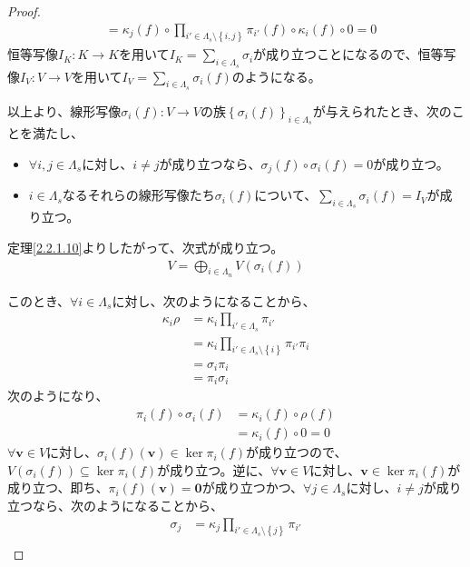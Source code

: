 \documentclass[dvipdfmx]{jsarticle}
\begin{document}
\begin{proof}
\begin{align*}
&= \kappa_{j}(f) \circ \prod_{i' \in \varLambda_{s} \setminus \left\{ i,j \right\}} {\pi_{i'}(f)} \circ \kappa_{i}(f) \circ 0 = 0
\end{align*}
恒等写像$I_{K}:K \rightarrow K$を用いて$I_{K} = \sum_{i \in \varLambda_{s}} \sigma_{i}$が成り立つことになるので、恒等写像$I_{V}:V \rightarrow V$を用いて$I_{V} = \sum_{i \in \varLambda_{s}} {\sigma_{i}(f)}$のようになる。\par
以上より、線形写像$\sigma_{i}(f):V \rightarrow V$の族$\left\{ \sigma_{i}(f) \right\}_{i \in \varLambda_{s}}$が与えられたとき、次のことを満たし、
\begin{itemize}
\item
  $\forall i,j \in \varLambda_{s}$に対し、$i \neq j$が成り立つなら、$\sigma_{j}(f) \circ \sigma_{i}(f) = 0$が成り立つ。
\item
  $i \in \varLambda_{s}$なるそれらの線形写像たち$\sigma_{i}(f)$について、$\sum_{i \in \varLambda_{s}} {\sigma_{i}(f)} = I_{V}$が成り立つ。
\end{itemize}
定理\ref{2.2.1.10}よりしたがって、次式が成り立つ。
\begin{align*}
V = \bigoplus_{i \in \varLambda_{n}} {V\left( \sigma_{i}(f) \right)}
\end{align*}\par
このとき、$\forall i \in \varLambda_{s}$に対し、次のようになることから、
\begin{align*}
\kappa_{i}\rho &= \kappa_{i}\prod_{i' \in \varLambda_{s}} {\pi_{i'}}\\
&= \kappa_{i}\prod_{i' \in \varLambda_{s} \setminus \left\{ i \right\}} {\pi_{i'}}\pi_{i}\\
&= \sigma_{i}\pi_{i}\\
&= \pi_{i}\sigma_{i}
\end{align*}
次のようになり、
\begin{align*}
\pi_{i}(f) \circ \sigma_{i}(f) &= \kappa_{i}(f) \circ \rho(f)\\
&= \kappa_{i}(f) \circ 0 = 0
\end{align*}
$\forall\mathbf{v} \in V$に対し、$\sigma_{i}(f)\left( \mathbf{v} \right) \in \ker{\pi_{i}(f)}$が成り立つので、$V\left( \sigma_{i}(f) \right) \subseteq \ker{\pi_{i}(f)}$が成り立つ。逆に、$\forall\mathbf{v} \in V$に対し、$\mathbf{v} \in \ker{\pi_{i}(f)}$が成り立つ、即ち、$\pi_{i}(f)\left( \mathbf{v} \right) = \mathbf{0}$が成り立つかつ、$\forall j \in \varLambda_{s}$に対し、$i \neq j$が成り立つなら、次のようになることから、
\begin{align*}
\sigma_{j} &= \kappa_{j}\prod_{i' \in \varLambda_{s} \setminus \left\{ j \right\}} {\pi_{i'}}\\

\end{align*}
\end{proof}
\end{document}
